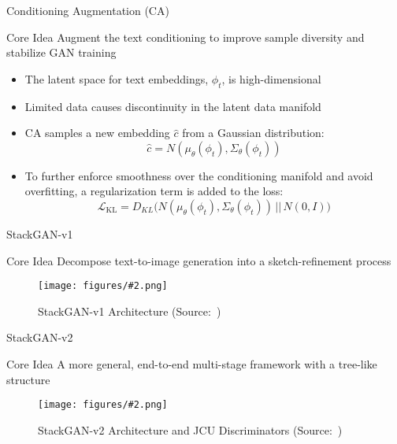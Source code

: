 \documentclass{beamer}
\newcommand{\paperfigure}[3][width=\textwidth]{%
    \begin{figure}%
        \centering%
        \texttt{[image: figures/\#2.png]}%
        \caption{#3 (Source:~\cite{stackgan++})}%
    \end{figure}%
}
\begin{document}
\begin{frame}{Conditioning Augmentation (CA)}
    \centering
    \begin{minipage}{0.8\textwidth}
        \begin{block}{Core Idea}
            \centering
            Augment the text conditioning to improve sample diversity and stabilize GAN training
        \end{block}
    \end{minipage}
    \vspace{1em}
    \begin{itemize}
        \item The latent space for text embeddings, $\phi_t$, is high-dimensional
        \item Limited data causes discontinuity in the latent data manifold
        \item CA samples a new embedding $\hat{c}$ from a Gaussian distribution:
        \[
        \hat{c} = N(\mu_\theta(\phi_t), \Sigma_\theta(\phi_t))
        \]
        \item To further enforce smoothness over the conditioning manifold and avoid overﬁtting, a regularization term is added to the loss:
        \[
        \mathcal{L}_{\text{KL}} = D_{KL}\big(N(\mu_\theta(\phi_t), \Sigma_\theta(\phi_t))\, ||\, N(0, I)\big)
        \]
    \end{itemize}  
\end{frame}


\begin{frame}{StackGAN-v1}
    \centering
    \begin{minipage}{0.8\textwidth}
        \begin{block}{Core Idea}
            \centering
            Decompose text-to-image generation into a sketch-refinement process
        \end{block}
    \end{minipage}
    \paperfigure[width=0.9\textwidth]{stackgan_v1}{StackGAN-v1 Architecture}
\end{frame}

\begin{frame}{StackGAN-v2}
    \centering
    \begin{minipage}{0.8\textwidth}
        \begin{block}{Core Idea}
            \centering
            A more general, end-to-end multi-stage framework with a tree-like structure
        \end{block}
    \end{minipage}
    \paperfigure[width=0.9\textwidth]{stackgan_v2}{StackGAN-v2 Architecture and JCU Discriminators}
\end{frame}
\end{document}
